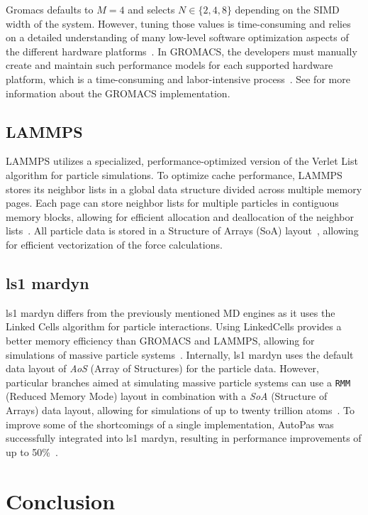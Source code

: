 \documentclass[conference]{IEEEtran}
\begin{document}
Gromacs defaults to $M=4$ and selects $N \in \{2, 4, 8\}$ depending on the SIMD width of the system. However, tuning those values is time-consuming and relies on a detailed understanding of many low-level software optimization aspects of the different hardware platforms~\cite{PALL20132641}. In GROMACS, the developers must manually create and maintain such performance models for each supported hardware platform, which is a time-consuming and labor-intensive process~\cite{PALL20132641}. See \cite{ABRAHAM201519} for more information about the GROMACS implementation.

\subsection{LAMMPS}

LAMMPS utilizes a specialized, performance-optimized version of the Verlet List algorithm for particle simulations. To optimize cache performance, LAMMPS stores its neighbor lists in a global data structure divided across multiple memory pages. Each page can store neighbor lists for multiple particles in contiguous memory blocks, allowing for efficient allocation and deallocation of the neighbor lists~\cite{THOMPSON2022108171}. All particle data is stored in a Structure of Arrays (SoA) layout~\cite{THOMPSON2022108171}, allowing for efficient vectorization of the force calculations.

\subsection{ls1 mardyn}

ls1 mardyn differs from the previously mentioned MD engines as it uses the Linked Cells algorithm for particle interactions. Using LinkedCells provides a better memory efficiency than GROMACS and LAMMPS, allowing for simulations of massive particle systems~\cite{tchipev2019twe}. Internally, ls1 mardyn uses the default data layout of \textit{AoS} (Array of Structures) for the particle data. However, particular branches aimed at simulating massive particle systems can use a \texttt{RMM} (Reduced Memory Mode) layout in combination with a \textit{SoA} (Structure of Arrays) data layout, allowing for simulations of up to twenty trillion atoms~\cite{tchipev2019twe}. To improve some of the shortcomings of a single implementation, AutoPas was successfully integrated into ls1 mardyn, resulting in performance improvements of up to 50\%~\cite{SECKLER2021101296}.

\section{Conclusion}
\end{document}
